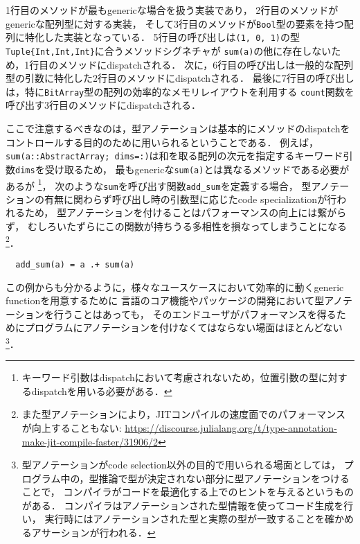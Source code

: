 \inputminted[frame=lines, linenos]{julia}{src/sums_method.jl}

1行目のメソッドが最もgenericな場合を扱う実装であり，
2行目のメソッドがgenericな配列型に対する実装，
そして3行目のメソッドが\verb|Bool|型の要素を持つ配列に特化した実装となっている．
5行目の呼び出しは\verb|(1, 0, 1)|の型\verb|Tuple{Int,Int,Int}|に合うメソッドシグネチャが
\verb|sum(a)|の他に存在しないため，1行目のメソッドにdispatchされる．
次に，6行目の呼び出しは一般的な配列型の引数に特化した2行目のメソッドにdispatchされる．
最後に7行目の呼び出しは，特に\verb|BitArray|型の配列の効率的なメモリレイアウトを利用する
\verb|count|関数を呼び出す3行目のメソッドにdispatchされる．

ここで注意するべきなのは，型アノテーションは基本的にメソッドのdispatchをコントロールする目的のために用いられるということである．
例えば，\verb|sum(a::AbstractArray; dims=:)|は和を取る配列の次元を指定するキーワード引数\verb|dims|を受け取るため，
最もgenericな\verb|sum(a)|とは異なるメソッドである必要があるが
\footnote{
  キーワード引数はdispatchにおいて考慮されないため，位置引数の型に対するdispatchを用いる必要がある．
}，
次のような\verb|sum|を呼び出す関数\verb|add_sum|を定義する場合，
型アノテーションの有無に関わらず呼び出し時の引数型に応じたcode specializationが行われるため，
型アノテーションを付けることはパフォーマンスの向上には繋がらず，
むしろいたずらにこの関数が持ちうる多相性を損なってしまうことになる
\footnote{
  また型アノテーションにより，JITコンパイルの速度面でのパフォーマンスが向上することもない:
  \url{https://discourse.julialang.org/t/type-annotation-make-jit-compile-faster/31906/2}
}．

\begin{verbatim}
  add_sum(a) = a .+ sum(a)
\end{verbatim}

この例からも分かるように，様々なユースケースにおいて効率的に動くgeneric functionを用意するために
言語のコア機能やパッケージの開発において型アノテーションを行うことはあっても，
そのエンドユーザがパフォーマンスを得るためにプログラムにアノテーションを付けなくてはならない場面はほとんどない
\footnote{
  型アノテーションがcode selection以外の目的で用いられる場面としては，
  プログラム中の，型推論で型が決定されない部分に型アノテーションをつけることで，
  コンパイラがコードを最適化する上でのヒントを与えるというものがある\cite{type-annotation}．
  コンパイラはアノテーションされた型情報を使ってコード生成を行い，
  実行時にはアノテーションされた型と実際の型が一致することを確かめるアサーションが行われる．
}．

